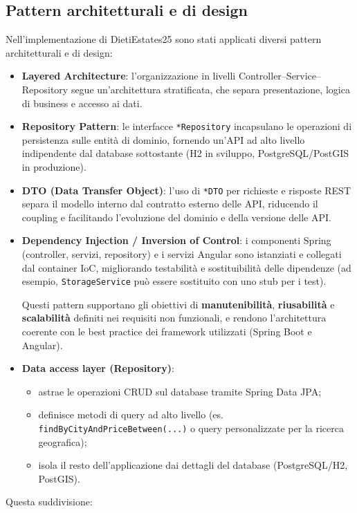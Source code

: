 \documentclass[a4paper,11pt]{report}
\begin{document}
\pagebreak

    \subsection{Pattern architetturali e di design}
    
    Nell'implementazione di DietiEstates25 sono stati applicati diversi pattern architetturali e di design:
    
\begin{itemize}    
    \item \textbf{Layered Architecture}:
    l'organizzazione in livelli Controller--Service--Repository segue un'architettura stratificata, che separa presentazione, logica di business e accesso ai dati.
    
    \item \textbf{Repository Pattern}:
    le interfacce \texttt{*Repository} incapsulano le operazioni di persistenza sulle entità di dominio, fornendo un'API ad alto livello indipendente dal database sottostante (H2 in sviluppo, PostgreSQL/PostGIS in produzione).
    
    \item \textbf{DTO (Data Transfer Object)}:
    l'uso di \texttt{*DTO} per richieste e risposte REST separa il modello interno dal contratto esterno delle API, riducendo il coupling e facilitando l'evoluzione del dominio e della versione delle API.
    
    \item \textbf{Dependency Injection / Inversion of Control}:
    i componenti Spring (controller, servizi, repository) e i servizi Angular sono istanziati e collegati dal container IoC, migliorando testabilità e sostituibilità delle dipendenze (ad esempio, \texttt{StorageService} può essere sostituito con uno stub per i test). 
    
    Questi pattern supportano gli obiettivi di \textbf{manutenibilità}, \textbf{riusabilità} e \textbf{scalabilità} definiti nei requisiti non funzionali, e rendono l'architettura coerente con le best practice dei framework utilizzati (Spring Boot e Angular).
    
    \item \textbf{Data access layer (Repository)}:
    \begin{itemize}[nosep]
      \item astrae le operazioni CRUD sul database tramite Spring Data JPA;
      \item definisce metodi di query ad alto livello (es. \texttt{findByCityAndPriceBetween(...)} o query personalizzate per la ricerca geografica);
      \item isola il resto dell'applicazione dai dettagli del database (PostgreSQL/H2, PostGIS).
    \end{itemize}
\end{itemize}
Questa suddivisione:
\end{document}
